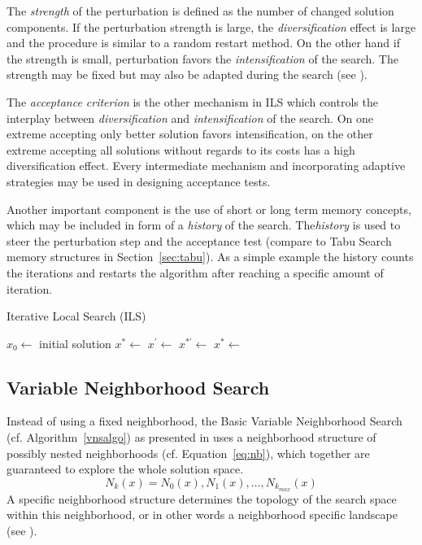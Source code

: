 The \emph{strength} of the perturbation is defined as the number of changed solution components. 
If the perturbation strength is large, the \emph{diversification} effect is large and the procedure is similar to a random restart method. On the other hand if the strength is small, perturbation favors the \emph{intensification} of the search. The strength may be fixed but may also be adapted during the search (see \cite{lourencco2001iterated}).

The \emph{acceptance criterion} is the other mechanism in ILS which controls the interplay between \emph{diversification} and \emph{intensification} of the search. 
On one extreme accepting only better solution favors intensification, on the other extreme accepting all solutions without regards to its costs has a high diversification effect. Every intermediate mechanism and incorporating adaptive strategies may be used in designing acceptance tests.  

Another important component is the use of short or long term memory concepts, which may be included in form of a \emph{history} of the search. The\emph{history} is used to steer the perturbation step and the acceptance test (compare to Tabu Search memory structures in Section~\ref{sec:tabu}). As a simple example the history counts the iterations and restarts the algorithm after reaching a specific amount of iteration.
 
\begin{algorithm}
\caption{Iterative Local Search (ILS)}
\label{ilsalgo}
\begin{algorithmic}[1]
\State $x_0\gets$ initial solution
\State $x^*\gets$ 
\Repeat
\State $x^\prime \gets$ 
\State $x^{*\prime} \gets$ 
\State $x^* \gets$ 
\end{algorithmic}
\end{algorithm}

\subsection{Variable Neighborhood Search}\label{sec:vns}
Instead of using a fixed neighborhood, the Basic Variable Neighborhood Search (cf. Algorithm~\ref{vnsalgo}) as presented in \cite{VNS} uses a neighborhood structure of possibly nested neighborhoods (cf. Equation~\ref{eq:nb}), which together are guaranteed to explore the whole solution space. 
\begin{equation}
N_k(x)=N_0(x),N_1(x),\dots,N_{k_{max}}(x)
\label{eq:nb}
\end{equation}
A specific neighborhood structure determines the topology of the search space within this neighborhood, or in other words a neighborhood specific landscape (see \cite{blum2003metaheuristics}).

